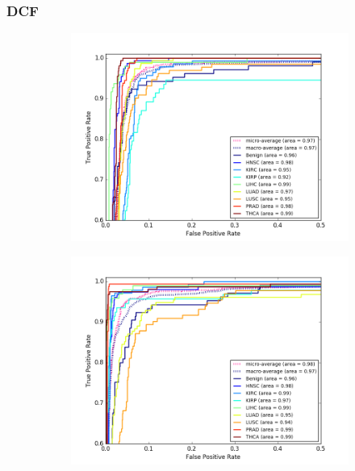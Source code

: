\subsubsection{DCF}

\begin{figure}[H]
     \centering
     \begin{subfigure}[b]{0.49\textwidth}
         \centering
         \includegraphics[width=\textwidth]{img/m_r/m_r_dcf_dgmu_roc.png}
         \caption{}
     \end{subfigure}
     \hfill
     \begin{subfigure}[b]{0.49\textwidth}
         \centering
         \includegraphics[width=\textwidth]{img/m_r/m_r_dcf_gmu_roc.png}

\end{subfigure}
\end{figure}
